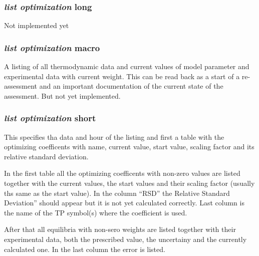 \documentclass[11pt]{article}
\begin{document}
\hypertarget{List optimization long}{}
\subsubsection{{\em list optimization} long}

Not implemented yet

\hypertarget{List optimization macro}{}
\subsubsection{{\em list optimization} macro}

A listing of all thermodynamic data and current values of model
parameter and experimental data with current weight.  This can be read
back as a start of a re-assessment and an important documentation of
the current state of the assessment.  But not yet implemented.

\hypertarget{List optimization short}{}
\subsubsection{{\em list optimization} short}\label{sc:listoptshort}

This specifies tha data and hour of the listing and first a table with
the optimizing coefficents with name, current value, start value,
scaling factor and its relative standard deviation.

In the first table all the optimizing coefficents with non-zero values
are listed together with the current values, the start values and
their scaling factor (usually ths same as the start value).  In the
column ``RSD'' the Relative Standard Deviation'' should appear but it
is not yet calculated correctly.  Last column is the name of the TP
symbol(s) where the coefficient is used.

After that all equilibria with non-sero weights are listed together
with their experimental data, both the prescribed value, the
uncertainy and the currently calculated one.  In the last column the
error is listed.
\end{document}
